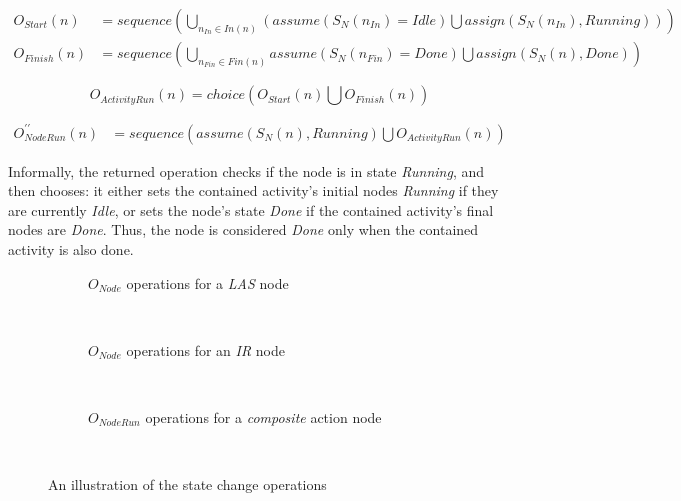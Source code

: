 \begin{definition}
	\begin{align*}
		O_\mathit{Start}(n) &= \mathit{sequence}\left(
			\bigcup_{n_\mathit{In} \in \mathit{In}(n)} \left(\mathit{assume}(S_N(n_\mathit{In}) = \mathit{Idle}) \bigcup \mathit{assign}(S_N(n_\mathit{In}), \mathit{Running})
		\right)\right)\\
		O_\mathit{Finish}(n) &= \mathit{sequence}\left(
			\bigcup_{n_\mathit{Fin} \in \mathit{Fin}(n)} \mathit{assume}(S_N(n_\mathit{Fin}) = \mathit{Done}) \bigcup \mathit{assign}(S_N(n), \mathit{Done})
		\right)
	\end{align*}

	\begin{equation*}
		O_\mathit{ActivityRun}(n) = \mathit{choice}\left(O_\mathit{Start}(n) \bigcup O_\mathit{Finish}(n)\right)
	\end{equation*}
	
	\begin{align*}
		O_\mathit{NodeRun}^{\prime\prime}(n) &= \mathit{sequence}\left(\mathit{assume}(S_N(n), \mathit{Running}) \bigcup O_\mathit{ActivityRun}(n)\right)
	\end{align*}

	Informally, the returned operation checks if the node is in state \emph{Running}, and then chooses: it either sets the contained activity's initial nodes \emph{Running} if they are currently \emph{Idle}, or sets the node's state \emph{Done} if the contained activity's final nodes are \emph{Done}. Thus, the node is considered \emph{Done} only when the contained activity is also done.

\end{definition}

\begin{figure}[!ht]
\centering
\begin{subfigure}[b]{\textwidth}
	\centering
	
	\caption{\(O_\mathit{Node}\) operations for a \emph{LAS} node}
	\label{fig:activity-state-function-las}
\end{subfigure}\\
\vspace{10mm}
\begin{subfigure}[b]{\textwidth}
	\centering
	
	\caption{\(O_\mathit{Node}\) operations for an \emph{IR} node}
	\label{fig:activity-state-function-ir}
\end{subfigure}\\
\vspace{10mm}
\begin{subfigure}[b]{\textwidth}
	\centering
	
	\caption{\(O_\mathit{NodeRun}\) operations for a \emph{composite} action node}
	\label{fig:activity-state-function-composite}
\end{subfigure}\\
\caption{An illustration of the state change operations}
\label{fig:activity-state-functions}
\end{figure}


